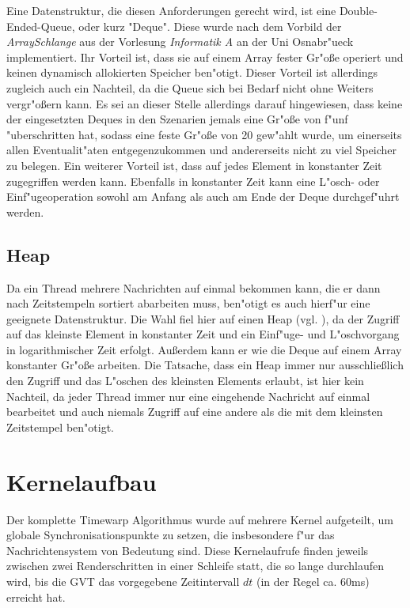 \documentclass[a4paper, 10pt, openright, parskip, chapterprefix]{scrreprt}
\begin{document}
Eine Datenstruktur, die diesen Anforderungen gerecht wird, ist eine Double-Ended-Queue, oder kurz "Deque". Diese wurde
nach dem Vorbild der \emph{ArraySchlange} aus der Vorlesung \emph{Informatik A} \cite{ainf} an der Uni Osnabr"ueck
implementiert. Ihr Vorteil ist, dass sie auf einem Array fester Gr"o\ss e operiert und keinen dynamisch allokierten
Speicher ben"otigt. Dieser Vorteil ist allerdings zugleich auch ein Nachteil, da die Queue sich bei Bedarf nicht ohne
Weiters vergr"o\ss ern kann. Es sei an dieser Stelle allerdings darauf hingewiesen, dass keine der eingesetzten
Deques in den Szenarien jemals eine Gr"o\ss e von f"unf "uberschritten hat, sodass eine feste Gr"o\ss e von 20
gew"ahlt wurde, um einerseits allen Eventualit"aten entgegenzukommen und andererseits nicht zu viel Speicher zu belegen.
Ein weiterer Vorteil ist, dass auf jedes Element in konstanter Zeit zugegriffen werden kann. Ebenfalls in konstanter
Zeit kann eine L"osch- oder Einf"ugeoperation sowohl am Anfang als auch am Ende der Deque durchgef"uhrt werden.

\subsection{Heap}
Da ein Thread mehrere Nachrichten auf einmal bekommen kann, die er dann nach Zeitstempeln sortiert abarbeiten muss,
ben"otigt es auch hierf"ur eine geeignete Datenstruktur. Die Wahl fiel hier auf einen Heap (vgl. \cite[Heapsort]{ainf}), da der
Zugriff auf das kleinste Element in konstanter Zeit und ein Einf"uge- und L"oschvorgang in logarithmischer Zeit erfolgt.
Au\ss erdem kann er wie die Deque auf einem Array konstanter Gr"o\ss e arbeiten.
Die Tatsache, dass ein Heap immer nur ausschlie\ss lich den Zugriff und das L"oschen des kleinsten Elements erlaubt, ist
hier kein Nachteil, da jeder Thread immer nur eine eingehende Nachricht auf einmal bearbeitet und auch niemals Zugriff auf eine
andere als die mit dem kleinsten Zeitstempel ben"otigt.

\section{Kernelaufbau}
\label{sec:Kernelaufbau}
Der komplette Timewarp Algorithmus wurde auf mehrere Kernel aufgeteilt, um globale Synchronisationspunkte zu setzen, die
insbesondere f"ur das Nachrichtensystem von Bedeutung sind. 
Diese Kernelaufrufe finden jeweils zwischen zwei Renderschritten in einer Schleife statt, die so lange durchlaufen wird,
bis die GVT das vorgegebene Zeitintervall $dt$ (in der Regel ca. 60ms) erreicht hat.
\end{document}
